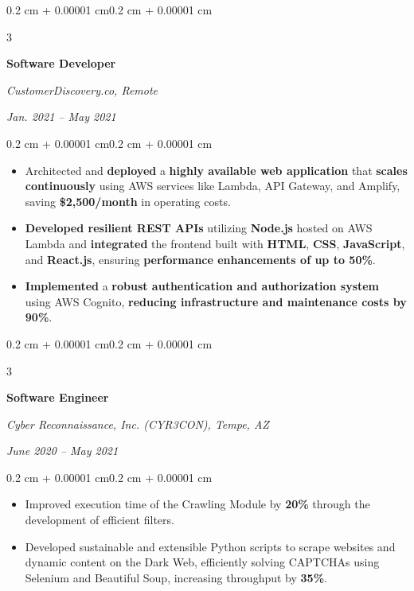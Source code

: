 \documentclass[10pt]{article}
\newenvironment{highlights}{
    \begin{itemize}[leftmargin=15pt, topsep=1pt, itemsep=1pt]
}{
    \end{itemize}
}
\newenvironment{onecolentry}{
    \begin{adjustwidth}{0.2 cm + 0.00001 cm}{0.2 cm + 0.00001 cm}
}{
    \end{adjustwidth}
}
\newenvironment{threecolentry}[3]{
    \onecolentry
    \def\firstColumn{#1}
    \def\secondColumn{#2}
    \def\thirdColumn{#3}
    \setcolumnwidth{6cm, 11.5cm, 5cm}
    \begin{paracol}{3}
    \firstColumn
}{
    \switchcolumn[1] \centering \secondColumn
    \switchcolumn[2] \raggedleft \thirdColumn
    \end{paracol}
    \endonecolentry
}
\begin{document}
        \vspace{0.3 cm}

        \begin{threecolentry}{
            \raggedright\textbf{Software Developer}
            }{
            \centering\textit{CustomerDiscovery.co, Remote}
            }{
            \raggedleft\textit{Jan. 2021 -- May 2021}
            }
        \end{threecolentry}

        \vspace{0.10 cm}
        \begin{onecolentry}
            \begin{highlights}
                \item Architected and \textbf{deployed} a \textbf{highly available web application} that \textbf{scales continuously} using AWS services like Lambda, API Gateway, and Amplify, saving \textbf{\$2,500/month} in operating costs.
                \item \textbf{Developed resilient REST APIs} utilizing \textbf{Node.js} hosted on AWS Lambda and \textbf{integrated} the frontend built with \textbf{HTML}, \textbf{CSS}, \textbf{JavaScript}, and \textbf{React.js}, ensuring \textbf{performance enhancements of up to 50\%}.
                \item \textbf{Implemented} a \textbf{robust authentication and authorization system} using AWS Cognito, \textbf{reducing infrastructure and maintenance costs by 90\%}.
            \end{highlights}
        \end{onecolentry}

        \vspace{0.3 cm}

        \begin{threecolentry}{
            \raggedright\textbf{Software Engineer}
            }{
            \centering\textit{Cyber Reconnaissance, Inc. (CYR3CON), Tempe, AZ}
            }{
            \raggedleft\textit{June 2020 -- May 2021}
            }
        \end{threecolentry}

        \vspace{0.10 cm}
        \begin{onecolentry}
            \begin{highlights}
                \item Improved execution time of the Crawling Module by \textbf{20\%} through the development of efficient filters.
                \item Developed sustainable and extensible Python scripts to scrape websites and dynamic content on the Dark Web, efficiently solving CAPTCHAs using Selenium and Beautiful Soup, increasing throughput by \textbf{35\%}.
            \end{highlights}
        \end{onecolentry}
\end{document}
